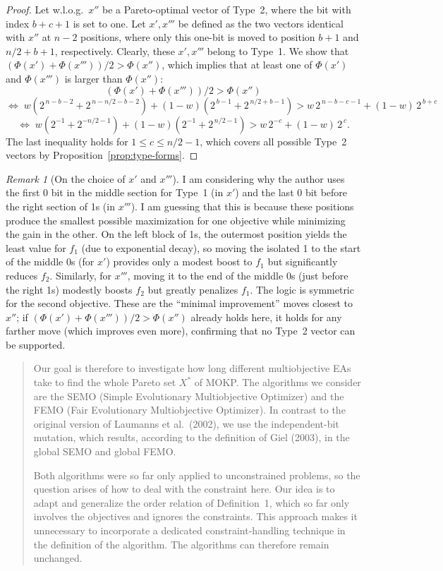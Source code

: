 \documentclass[a4paper, 11pt]{report}
\theoremstyle{remark}
\newtheorem*{remark}{Remark}
\begin{document}
\begin{proof}
Let w.l.o.g.\ $x''$ be a Pareto-optimal vector of Type~2, where the bit with index $b+c+1$ is set to one. Let $x',x'''$ be defined as the two vectors 
identical with $x''$ at $n-2$ positions, where only this one-bit is moved to position $b+1$ and $n/2+b+1$, respectively. Clearly, these $x',x'''$ belong to 
Type~1. We show that $(\Phi(x')+\Phi(x'''))/2>\Phi(x'')$, which implies that at least one of $\Phi(x')$ and $\Phi(x''')$ is larger than $\Phi(x'')$:
\[
(\Phi(x')+\Phi(x'''))/2>\Phi(x'')
\]
\[
\Leftrightarrow\;
w\!\left(2^{\,n-b-2}+2^{\,n-n/2-b-2}\right)
+(1-w)\!\left(2^{\,b-1}+2^{\,n/2+b-1}\right)
>
w\,2^{\,n-b-c-1}+(1-w)\,2^{\,b+c}
\]
\[
\Leftrightarrow\;
w\!\left(2^{-1}+2^{-n/2-1}\right)
+(1-w)\!\left(2^{-1}+2^{\,n/2-1}\right)
>
w\,2^{-c}+(1-w)\,2^{\,c}.
\]
The last inequality holds for $1\le c\le n/2-1$, which covers all possible Type~2 vectors by Proposition~\ref{prop:type-forms}. \qedhere
\end{proof}
\begin{remark}[On the choice of $x'$ and $x'''$]
    I am considering why the author uses the first 0 bit in the middle section for Type~1 (in \(x'\)) and the last 0 bit before the right section of 1s (in \(x'''\)). 
    I am guessing that this is because these positions produce the smallest possible maximization for one objective while minimizing the gain in the other. 
    On the left block of 1s, the outermost position yields the least value for \(f_1\) (due to exponential decay), so moving the isolated 1 to the start of the middle 0s 
    (for \(x'\)) provides only a modest boost to \(f_1\) but significantly reduces \(f_2\). Similarly, for \(x'''\), moving it to the end of the middle 0s (just before the 
    right 1s) modestly boosts \(f_2\) but greatly penalizes \(f_1\). The logic is symmetric for the second objective. These are the ``minimal improvement'' moves closest to \(x''\); 
    if \((\Phi(x')+\Phi(x'''))/2>\Phi(x'')\) already holds here, it holds for any farther move (which improves even more), confirming that no Type~2 vector can be supported.
\end{remark}
\begin{quote}
Our goal is therefore to investigate how long different multiobjective EAs take to find the whole Pareto set $X^*$ of MOKP. 
The algorithms we consider are the SEMO (Simple Evolutionary Multiobjective Optimizer) and the FEMO 
(Fair Evolutionary Multiobjective Optimizer). In contrast to the original version of Laumanns et al.\ (2002), 
we use the independent-bit mutation, which results, according to the definition of Giel (2003), 
in the global SEMO and global FEMO. 

Both algorithms were so far only applied to unconstrained problems, so the question arises of how to deal 
with the constraint here. Our idea is to adapt and generalize the order relation of Definition~1, 
which so far only involves the objectives and ignores the constraints. 
This approach makes it unnecessary to incorporate a dedicated constraint-handling technique 
in the definition of the algorithm. The algorithms can therefore remain unchanged.
\end{quote}
\end{document}
